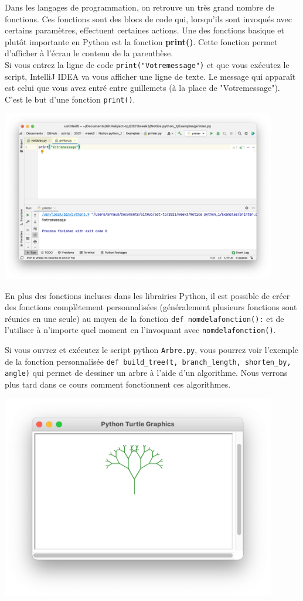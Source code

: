Dans les langages de programmation, on retrouve un très grand nombre de fonctions. Ces fonctions sont des blocs de code qui, lorsqu'ils sont invoqués avec certains paramètres, effectuent certaines actions. Une des fonctions basique et plutôt importante en Python est la fonction \textbf{print()}.  Cette fonction permet d'afficher à l'écran le contenu de la parenthèse.\\ 
Si vous entrez la ligne de code \lstinline{print("Votremessage")} et que vous exécutez le script, IntelliJ IDEA va vous afficher une ligne de texte. Le message qui apparaît est celui que vous avez entré entre guillemets (à la place de "Votremessage"). C'est le but d'une fonction \lstinline{print()}.
\begin{center}
\includegraphics[width=12cm]{8}	
\end{center}


En plus des fonctions incluses dans les librairies Python, il est possible de créer des fonctions complètement personnalisées (généralement plusieurs fonctions sont réunies en une seule) au moyen de la fonction \lstinline{def nomdelafonction():} et de l'utiliser à n'importe quel moment en l'invoquant avec \lstinline{nomdelafonction()}.


Si vous ouvrez et exécutez le script python \lstinline{Arbre.py}, vous pourrez voir l'exemple de la fonction personnalisée \lstinline{def build_tree(t, branch_length, shorten_by, angle)} qui permet de dessiner un arbre à l'aide d'un algorithme. Nous verrons plus tard dans ce cours comment fonctionnent ces algorithmes.

\begin{center}
\includegraphics[width=12cm]{arbre.png}		
\end{center}


